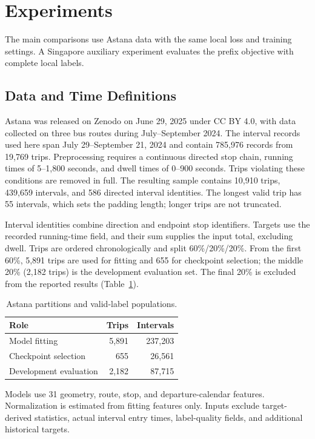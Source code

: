 \section{Experiments}
The main comparisons use Astana data with the same local loss and training settings. A Singapore auxiliary experiment evaluates the prefix objective with complete local labels.

\subsection{Data and Time Definitions}
Astana\cite{astana2025} was released on Zenodo on June 29, 2025 under CC BY 4.0, with data collected on three bus routes during July--September 2024. The interval records used here span July 29--September 21, 2024 and contain 785,976 records from 19,769 trips. Preprocessing requires a continuous directed stop chain, running times of 5--1,800 seconds, and dwell times of 0--900 seconds. Trips violating these conditions are removed in full. The resulting sample contains 10,910 trips, 439,659 intervals, and 586 directed interval identities. The longest valid trip has 55 intervals, which sets the padding length; longer trips are not truncated.

Interval identities combine direction and endpoint stop identifiers. Targets use the recorded running-time field, and their sum supplies the input total, excluding dwell. Trips are ordered chronologically and split 60\%/20\%/20\%. From the first 60\%, 5,891 trips are used for fitting and 655 for checkpoint selection; the middle 20\% (2,182 trips) is the development evaluation set. The final 20\% is excluded from the reported results (Table~\ref{tab:partitions}).
\begin{table}[t]
\centering\footnotesize
\caption{Astana partitions and valid-label populations.}\label{tab:partitions}
\begin{tabular}{lrr}\toprule
Role & Trips & Intervals\\\midrule
Model fitting & 5,891 & 237,203\\
Checkpoint selection & 655 & 26,561\\
Development evaluation & 2,182 & 87,715\\
\bottomrule\end{tabular}
\end{table}

Models use 31 geometry, route, stop, and departure-calendar features. Normalization is estimated from fitting features only. Inputs exclude target-derived statistics, actual interval entry times, label-quality fields, and additional historical targets.

